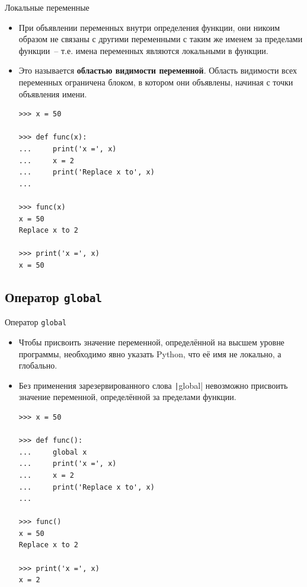 \documentclass[aspectratio=169]{beamer}%
\begin{document}
\begin{frame}[fragile]{Локальные переменные}
\scriptsize
\begin{itemize}
\item При объявлении переменных внутри определения функции, они никоим образом не связаны с другими переменными с таким же именем за пределами функции~-- т.е. имена переменных являются локальными в функции. 
\item Это называется \textcolor{extraorange}{\textbf{областью видимости переменной}}. Область видимости всех переменных ограничена блоком, в котором они объявлены, начиная с точки объявления имени.

\begin{verbatim}
>>> x = 50

>>> def func(x):
...     print('x =', x)
...     x = 2
...     print('Replace x to', x)
...

>>> func(x)
x = 50
Replace x to 2

>>> print('x =', x)
x = 50
\end{verbatim}
\end{itemize}
\vfill
\end{frame}


\subsection{Оператор \texttt{global}}

\begin{frame}[fragile]{Оператор \texttt{global}}
\scriptsize
\begin{itemize}
\item Чтобы присвоить значение переменной, определённой на высшем уровне программы, необходимо явно указать Python, что её имя не локально, а глобально.
\item Без применения зарезервированного слова \texttt|global| невозможно присвоить значение переменной, определённой за пределами функции.

\begin{verbatim}
>>> x = 50

>>> def func():
...     global x
...     print('x =', x)
...     x = 2
...     print('Replace x to', x)
...

>>> func()
x = 50
Replace x to 2

>>> print('x =', x)
x = 2
\end{verbatim}
\end{itemize}
\vfill
\end{frame}
\end{document}
